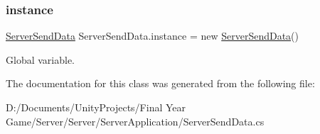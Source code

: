\subsubsection{\texorpdfstring{instance}{instance}}
{\footnotesize\ttfamily \mbox{\hyperlink{class_server_send_data}{Server\+Send\+Data}} Server\+Send\+Data.\+instance = new \mbox{\hyperlink{class_server_send_data}{Server\+Send\+Data}}()\hspace{0.3cm}{\ttfamily [static]}}



Global variable. 



The documentation for this class was generated from the following file\+:\begin{DoxyCompactItemize}
\item 
D\+:/\+Documents/\+Unity\+Projects/\+Final Year Game/\+Server/\+Server/\+Server\+Application/Server\+Send\+Data.\+cs\end{DoxyCompactItemize}
